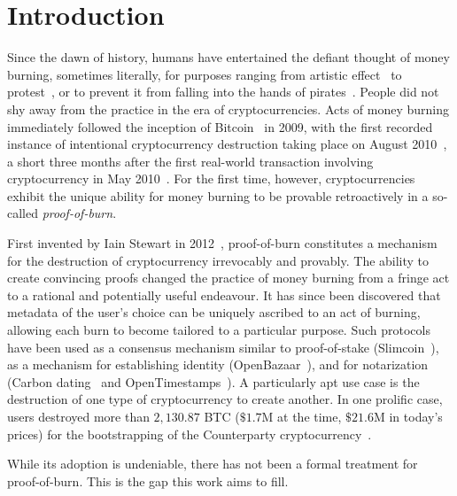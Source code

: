 \section{Introduction}\label{section:introduction}
Since the dawn of history, humans have entertained the defiant thought of money
burning, sometimes literally, for purposes ranging from artistic effect~\cite{kfoundation} to
protest~\cite{armchair}, or to prevent it from falling into the hands of pirates~\cite{laertiuslives,ciceroinventione}.
People did not shy away from the practice in the era of cryptocurrencies.
Acts of money burning immediately followed the inception of Bitcoin~\cite{bitcoin} in 2009,
with the first recorded instance of intentional cryptocurrency destruction
taking place on August 2010~\cite{interesting-address}, a short three months after the first real-world
transaction involving cryptocurrency in May 2010~\cite{SP:BMCNKF15}. For the first time, however,
cryptocurrencies exhibit the unique ability for money burning to be provable
retroactively in a so-called \emph{proof-of-burn}.

First invented by Iain
Stewart in 2012~\cite{stewart}, proof-of-burn constitutes a mechanism for the
destruction of cryptocurrency irrevocably and provably.
The ability to create convincing proofs changed the practice of money burning
from a fringe act to a rational and potentially useful endeavour. It has since
been discovered that metadata of the user's choice can be uniquely ascribed to
an act of burning, allowing each burn to become tailored to a particular
purpose. Such protocols have been used as a consensus mechanism similar to
proof-of-stake (Slimcoin~\cite{slimcoin}), as a mechanism for establishing
identity (OpenBazaar~\ifanonymous\cite{openbazaarreputationpledges}\else\cite{openbazaarreputationpledges,zindros2016trust}\fi), and for notarization (Carbon
dating~\cite{clark2012commitcoin} and
OpenTimestamps~\cite{todd2016opentimestamps}). A particularly apt use case is
the destruction of one type of cryptocurrency to create another. In one
prolific case, users destroyed more than $2{,}130.87$ BTC ($\$1.7$M at the
time, $\$21.6$M in today's prices) for the bootstrapping of the
Counterparty cryptocurrency~\cite{counterparty}.

While its adoption is undeniable, there has not been a formal treatment for
proof-of-burn. This is the gap this work aims to fill.

